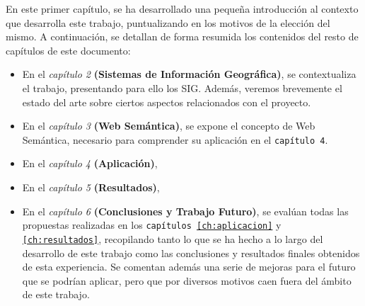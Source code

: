 En este primer capítulo, se ha desarrollado una pequeña introducción al contexto que desarrolla este trabajo, puntualizando en los motivos de la elección del mismo. A continuación, se detallan de forma resumida los contenidos del resto de capítulos de este documento:

\begin{itemize}
	\item En el \textit{capítulo 2} \textbf{(Sistemas de Información Geográfica)}, se contextualiza el trabajo, presentando para ello los SIG. Además, veremos brevemente el estado del arte sobre ciertos aspectos relacionados con el proyecto.
	
	\item En el \textit{capítulo 3} \textbf{(Web Semántica)}, se expone el concepto de Web Semántica, necesario para comprender su aplicación en el \texttt{capítulo 4}.
	
	\item En el \textit{capítulo 4} \textbf{(Aplicación)}, 
	
	\item En el \textit{capítulo 5} \textbf{(Resultados)}, 

	\item En el \textit{capítulo 6} \textbf{(Conclusiones y Trabajo Futuro)}, se evalúan todas las propuestas realizadas en los \texttt{capítulos \ref{ch:aplicacion}} y \texttt{\ref{ch:resultados}}, recopilando tanto lo que se ha hecho a lo largo del desarrollo de este trabajo como las conclusiones y resultados finales obtenidos de esta experiencia. Se comentan además una serie de mejoras para el futuro que se podrían aplicar, pero que por diversos motivos caen fuera del ámbito de este trabajo.
	
	
\end{itemize}


